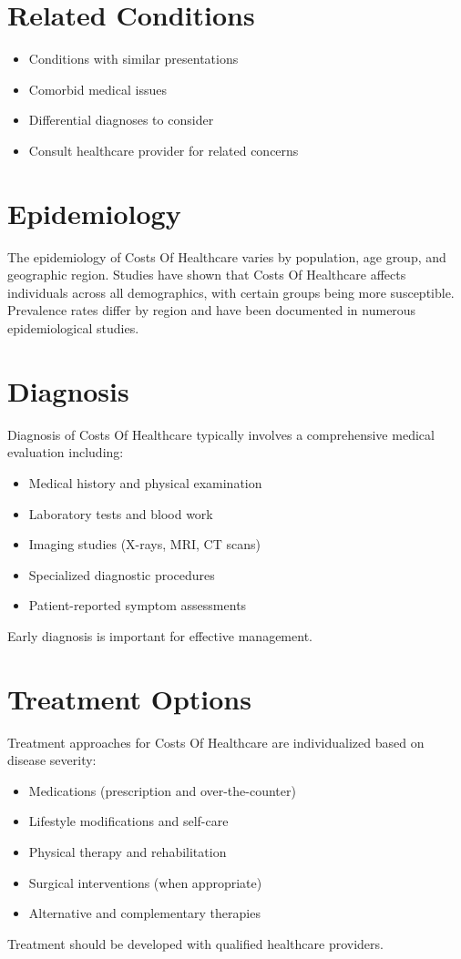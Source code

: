 \section*{Related Conditions}
\begin{itemize}
  \item Conditions with similar presentations
  \item Comorbid medical issues
  \item Differential diagnoses to consider
  \item Consult healthcare provider for related concerns
\end{itemize}

\section*{Epidemiology}
The epidemiology of Costs Of Healthcare varies by population, age group, and geographic region. Studies have shown that Costs Of Healthcare affects individuals across all demographics, with certain groups being more susceptible. Prevalence rates differ by region and have been documented in numerous epidemiological studies.

\section*{Diagnosis}
Diagnosis of Costs Of Healthcare typically involves a comprehensive medical evaluation including:
\begin{itemize}
  \item Medical history and physical examination
  \item Laboratory tests and blood work
  \item Imaging studies (X-rays, MRI, CT scans)
  \item Specialized diagnostic procedures
  \item Patient-reported symptom assessments
\end{itemize}
Early diagnosis is important for effective management.

\section*{Treatment Options}
Treatment approaches for Costs Of Healthcare are individualized based on disease severity:
\begin{itemize}
  \item Medications (prescription and over-the-counter)
  \item Lifestyle modifications and self-care
  \item Physical therapy and rehabilitation
  \item Surgical interventions (when appropriate)
  \item Alternative and complementary therapies
\end{itemize}
Treatment should be developed with qualified healthcare providers.

